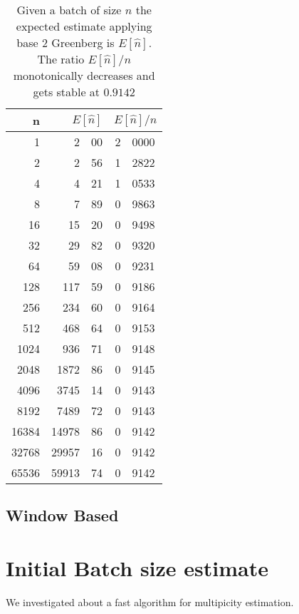 \documentclass[12pt,a4paper,twocolumns]{report}
\begin{document}
\begin{table}[htdp]
\caption[Expected Estimate with Greenberg]{Given a batch of size $n$ the expected estimate applying base 2 Greenberg is $E[\hat{n}]$. The ratio $E[\hat{n}]/n$ monotonically decreases and gets stable at $0.9142$}
\begin{center}
\begin{tabular}{rr@{.}lr@{.}l}
 n & \multicolumn{2}{r}{$E[\hat{n}]$} & \multicolumn{2}{c}{$E[\hat{n}]/n$} \\ \hline \hline
1 &     2&00 &   2&0000 \\ 
2 &     2&56 &   1&2822 \\ 
4 &     4&21 &   1&0533 \\ 
8 &     7&89 &   0&9863 \\ 
16 &    15&20 &   0&9498 \\ 
32 &    29&82 &   0&9320 \\ 
64 &    59&08 &   0&9231 \\ 
128 &   117&59 &   0&9186 \\ 
256 &   234&60 &   0&9164 \\ 
512 &   468&64 &   0&9153 \\ 
1024 &   936&71 &   0&9148 \\ 
2048 &  1872&86 &   0&9145 \\ 
4096 &  3745&14 &   0&9143 \\ 
8192 &  7489&72 &   0&9143 \\ 
16384 & 14978&86 &   0&9142 \\ 
32768 & 29957&16 &   0&9142 \\ 
65536 & 59913&74 &   0&9142 \\ 
\end{tabular}
\end{center}
\end{table}%


\section{Window Based}
\chapter{Initial Batch size estimate}
We investigated about a fast algorithm for multipicity estimation.\\
\end{document}
